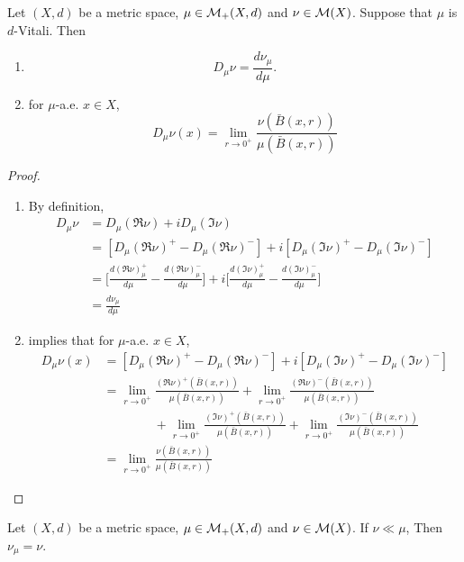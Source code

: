 \documentclass{book}
\begin{document}
	\begin{ex} 
		Let $(X, d)$ be a metric space, $\mu \in \mathcal{M}_+(X, d)$ and $\nu \in \mathcal{M}(X)$. Suppose that $\mu$ is $d$-Vitali. Then 
		\begin{enumerate}
			\item $$D_{\mu} \nu = \frac{d\nu_{\mu}}{d \mu}.$$
			\item for $\mu$-a.e. $x \in X$, 
			$$D_{\mu} \nu(x) = \lim_{r \rightarrow 0^+} \frac{ \nu(\bar{B}(x, r))}{\mu(\bar{B}(x, r))}$$
		\end{enumerate}
	\end{ex}

	\begin{proof}\
		\begin{enumerate}
			\item By definition, 
			\begin{align*}
				D_{\mu} \nu
				& = D_{\mu} (\Re \nu) + i D_{\mu} (\Im \nu) \\
				& = [D_{\mu} (\Re \nu)^+ - D_{\mu} (\Re \nu)^-] + i [D_{\mu} (\Im \nu)^+ - D_{\mu} (\Im \nu)^-] \\
				& = \bigg[ \frac{ d(\Re \nu)^+_{\mu}}{d\mu} - \frac{d (\Re \nu)^-_{\mu}}{d \mu} \bigg] + i \bigg[ \frac{d (\Im \nu)^+_{\mu}}{d \mu} - \frac{d (\Im \nu)^-_{\mu}}{d \mu} \bigg] \\
				& = \frac{d \nu_{\mu}}{d \mu}
			\end{align*}
			\item {} implies that for $\mu$-a.e. $x \in X$, 
			\begin{align*}
				D_{\mu} \nu(x)
				& = [D_{\mu} (\Re \nu)^+ - D_{\mu} (\Re \nu)^-] + i [D_{\mu} (\Im \nu)^+ - D_{\mu} (\Im \nu)^-] \\
				& = \lim_{r \rightarrow 0^+} \frac{ (\Re \nu)^+(\bar{B}(x, r))}{\mu(\bar{B}(x, r))} + \lim_{r \rightarrow 0^+} \frac{ (\Re \nu)^-(\bar{B}(x, r))}{\mu(\bar{B}(x, r))} \\
				& \quad \quad \quad \quad  + \lim_{r \rightarrow 0^+} \frac{ (\Im \nu)^+(\bar{B}(x, r))}{\mu(\bar{B}(x, r))} + \lim_{r \rightarrow 0^+} \frac{ (\Im \nu)^- (\bar{B}(x, r))}{\mu(\bar{B}(x, r))} \\
				& = \lim_{r \rightarrow 0^+} \frac{\nu(\bar{B}(x, r))}{\mu(\bar{B}(x, r))}
			\end{align*}
		\end{enumerate}
	\end{proof}

	\begin{ex} 
		Let $(X, d)$ be a metric space, $\mu \in \mathcal{M}_+(X, d)$ and $\nu \in \mathcal{M}(X)$. If $\nu \ll \mu$, Then $\nu_{\mu} = \nu$.
	\end{ex}
\end{document}
